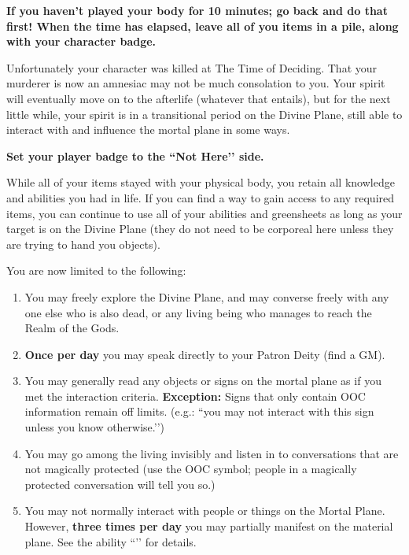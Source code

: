 \documentclass[green]{GL2020}
\begin{document}
\name{\\gLifeAfterDeath{}}

\textbf{If you haven't played your body for 10 minutes; go back and do that first! When the time has elapsed, leave all of you items in a pile, along with your character badge.}

Unfortunately your character was killed at The Time of Deciding. That your murderer is now an amnesiac may not be much consolation to you. Your spirit will eventually move on to the afterlife (whatever that entails), but for the next little while, your spirit is in a transitional period on the Divine Plane, still able to interact with and influence the mortal plane in some ways.

\textbf{Set your player badge to the ``Not Here’’ side.}

While all of your items stayed with your physical body, you retain all knowledge and abilities you had in life. If you can find a way to gain access to any required items, you can continue to use all of your abilities and greensheets as long as your target is on the Divine Plane (they do not need to be corporeal here unless they are trying to hand you objects).

You are now limited to the following:
\begin{enumerate}
  \item You may freely explore the Divine Plane, and may converse freely with any one else who is also dead, or any living being who manages to reach the Realm of the Gods.
  \item \textbf{Once per day} you may speak directly to your Patron Deity (find a GM).
  \item You may generally read any objects or signs on the mortal plane as if you met the interaction criteria. \textbf{Exception:} Signs that only contain OOC information remain off limits. (e.g.: ``you may not interact with this sign unless you know otherwise.’’)
  \item You may go among the living invisibly and listen in to conversations that are not magically protected (use the OOC symbol; people in a magically protected conversation will tell you so.)
  \item You may not normally interact with people or things on the Mortal Plane. However, \textbf{three times per day} you may partially manifest on the material plane. See the ability ``\aGhostlyMessage{}’’ for details. 
\end{enumerate}
\end{document}
